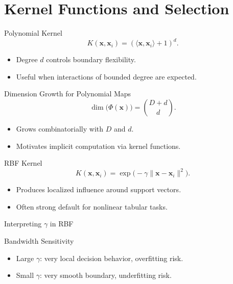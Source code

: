 \documentclass[10pt]{beamer}
\begin{document}
\section{Kernel Functions and Selection}

\begin{frame}{Polynomial Kernel}
  \justifying
  \[
    K(\bm{x},\bm{x}_i)=(\langle\bm{x},\bm{x}_i\rangle+1)^d.
  \]
  \begin{itemize}
    \item Degree $d$ controls boundary flexibility.
    \item Useful when interactions of bounded degree are expected.
  \end{itemize}
\end{frame}

\begin{frame}{Dimension Growth for Polynomial Maps}
  \justifying
  \[
    \dim\bigl(\Phi(\bm{x})\bigr)=\binom{D+d}{d}.
  \]
  \begin{itemize}
    \item Grows combinatorially with $D$ and $d$.
    \item Motivates implicit computation via kernel functions.
  \end{itemize}
\end{frame}

\begin{frame}{RBF Kernel}
  \justifying
  \[
    K(\bm{x},\bm{x}_i)=\exp\bigl(-\gamma\|\bm{x}-\bm{x}_i\|^2\bigr).
  \]
  \begin{itemize}
    \item Produces localized influence around support vectors.
    \item Often strong default for nonlinear tabular tasks.
  \end{itemize}
\end{frame}

\begin{frame}{Interpreting $\gamma$ in RBF}
  \justifying
  \begin{warningbox}{Bandwidth Sensitivity}
    \begin{itemize}
      \item Large $\gamma$: very local decision behavior, overfitting risk.
      \item Small $\gamma$: very smooth boundary, underfitting risk.
    \end{itemize}
  \end{warningbox}
\end{frame}
\end{document}
